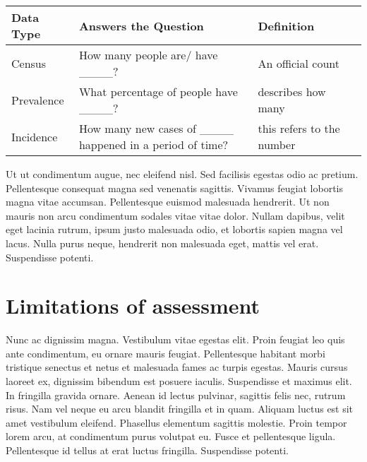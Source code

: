 \documentclass[
  letterpaper,
  DIV=11,
  numbers=noendperiod]{scrreprt}
\begin{document}
\begin{longtable}[]{@{}
  >{\raggedright\arraybackslash}p{}
  >{\raggedright\arraybackslash}p{}
  >{\raggedright\arraybackslash}p{}
  >{\raggedright\arraybackslash}p{}@{}}
\toprule\noalign{}
\begin{minipage}[b]{\linewidth}\raggedright
Data Type
\end{minipage} & \begin{minipage}[b]{\linewidth}\raggedright
Answers the Question
\end{minipage} & \begin{minipage}[b]{\linewidth}\raggedright
Definition
\end{minipage} & \begin{minipage}[b]{\linewidth}\raggedright
\end{minipage} \\
\midrule\noalign{}
\endhead
\bottomrule\noalign{}
\endlastfoot
Census & How many people are/ have \_\_\_\_? & An official count & \\
Prevalence & What percentage of people have \_\_\_\_? & describes how
many & \\
Incidence & How many new cases of \_\_\_\_ happened in a period of time?
& this refers to the number & \\
\end{longtable}

Ut ut condimentum augue, nec eleifend nisl. Sed facilisis egestas odio
ac pretium. Pellentesque consequat magna sed venenatis sagittis. Vivamus
feugiat lobortis magna vitae accumsan. Pellentesque euismod malesuada
hendrerit. Ut non mauris non arcu condimentum sodales vitae vitae dolor.
Nullam dapibus, velit eget lacinia rutrum, ipsum justo malesuada odio,
et lobortis sapien magna vel lacus. Nulla purus neque, hendrerit non
malesuada eget, mattis vel erat. Suspendisse potenti.

\section{Limitations of assessment}\label{limitations-of-assessment}

Nunc ac dignissim magna. Vestibulum vitae egestas elit. Proin feugiat
leo quis ante condimentum, eu ornare mauris feugiat. Pellentesque
habitant morbi tristique senectus et netus et malesuada fames ac turpis
egestas. Mauris cursus laoreet ex, dignissim bibendum est posuere
iaculis. Suspendisse et maximus elit. In fringilla gravida ornare.
Aenean id lectus pulvinar, sagittis felis nec, rutrum risus. Nam vel
neque eu arcu blandit fringilla et in quam. Aliquam luctus est sit amet
vestibulum eleifend. Phasellus elementum sagittis molestie. Proin tempor
lorem arcu, at condimentum purus volutpat eu. Fusce et pellentesque
ligula. Pellentesque id tellus at erat luctus fringilla. Suspendisse
potenti.
\end{document}
